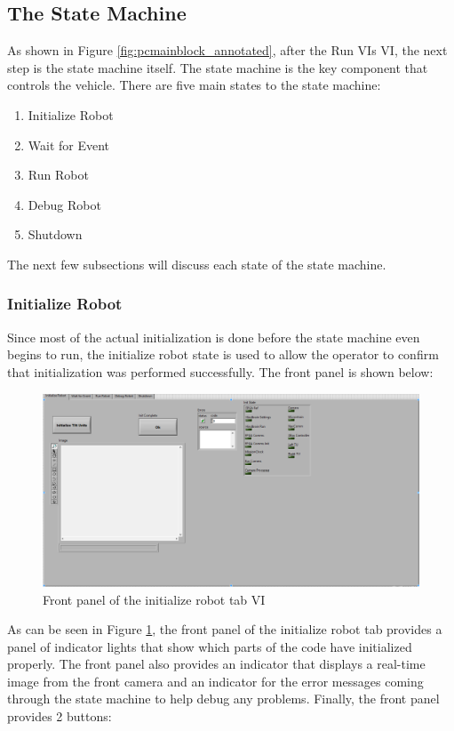 \subsection{The State Machine}

As shown in Figure \ref{fig:pcmainblock_annotated}, after the Run VIs VI, the next step is the state machine itself. The state machine is the key component that controls the vehicle. There are five main states to the state machine:

\begin{enumerate}
\item Initialize Robot
\item Wait for Event
\item Run Robot
\item Debug Robot
\item Shutdown
\end{enumerate}

The next few subsections will discuss each state of the state machine.

\subsubsection{Initialize Robot}

Since most of the actual initialization is done before the state machine even begins to run, the initialize robot state is used to allow the operator to confirm that initialization was performed successfully. The front panel is shown below:

\begin{figure}[h!]
\centering
\includegraphics[scale=0.65]{Photos/initrob_front.png}
\caption{Front panel of the initialize robot tab VI}
\label{fig:initrob_front}
\end{figure}

\noindent As can be seen in Figure \ref{fig:initrob_front}, the front panel of the initialize robot tab provides a panel of indicator lights that show which parts of the code have initialized properly. The front panel also provides an indicator that displays a real-time image from the front camera and an indicator for the error messages coming through the state machine to help debug any problems. Finally, the front panel provides 2 buttons:

